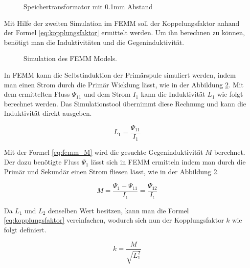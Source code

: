 \begin{figure}[h]
	\centering
	\qquad
	\caption{Speichertransformator mit 0.1mm Abstand}
	\label{fig:saettigung}
\end{figure}
\newpage

Mit Hilfe der zweiten Simulation im FEMM soll der Koppelungsfaktor anhand der Formel \ref{eq:kopplungsfaktor} ermittelt werden. Um ihn berechnen zu können, benötigt man die Induktivitäten und die Gegeninduktivität.

\begin{figure}[H]
	\centering
	\qquad
	\caption{Simulation des FEMM Models.}
	\label{fig:femmkopplung}
\end{figure}

In FEMM kann die Selbstinduktion der Primärspule simuliert werden, indem man einen Strom durch die Primär Wicklung lässt, wie in der Abbildung \ref{fig:femmkopplung}. Mit dem ermittelten Fluss $ \Psi_{11}  $ und dem Strom $ I_{1} $ kann die Induktivität $ L_{1} $ wie folgt berechnet werden. Das Simulationstool übernimmt diese Rechnung und kann die Induktivität direkt ausgeben.

\begin{equation}
L_{1}=\frac{\Psi_{11}}{I_{1}}
\label{eq:femm_l1}
\end{equation}

Mit der Formel \ref{eq:femm_M} wird die gesuchte Gegeninduktivität $ M $ berechnet.
Der dazu benötigte Fluss $ \Psi_{1} $ lässt sich in FEMM ermitteln indem man durch die Primär und Sekundär einen Strom fliesen lässt, wie in der Abbildung \ref{fig:femmkopplung}. 

\begin{equation}
M=\frac{\Psi_{1}-\Psi_{11}}{I_{1}}=\frac{\Psi_{12}}{I_{1}}
\label{eq:femm_M}
\end{equation}

Da $ L_{1} $ und $ L_{2} $ denselben Wert besitzen, kann man die Formel \ref{eq:kopplungsfaktor} vereinfachen, wodurch sich nun der Kopplungsfaktor $ k $ wie folgt definiert.

\begin{equation}
k=\frac{M}{\sqrt{L_{1}^{2}}}
\label{eq:kopplungsfaktor_neu}
\end{equation}

